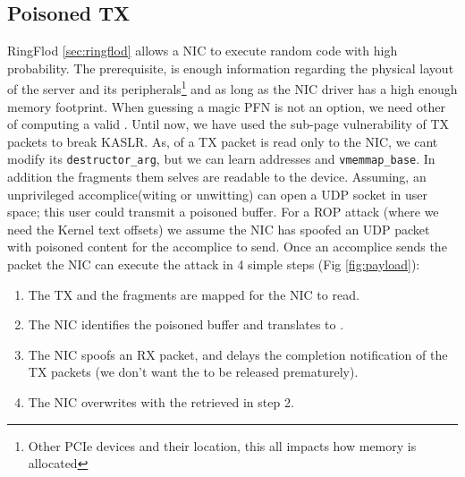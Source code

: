 \subsection{Poisoned TX}\label{sec:posion}
RingFlod \ref{sec:ringflod} allows a NIC to execute random code with high probability. The prerequisite, is enough information regarding the physical layout of the server and its peripherals\footnote{Other PCIe devices and their location, this all impacts how memory is allocated} and as long as the NIC driver has a high enough memory footprint. When guessing a magic PFN is not an option, we need other \means of computing a valid \kva.\newline
Until now, we have used the sub-page vulnerability of TX packets to break KASLR. As, \shinfo of a TX packet is read only to the NIC, we cant modify its \texttt{destructor\_arg}, but we can learn \page addresses and \texttt{vmemmap\_base}. In addition the fragments them selves are readable to the device. Assuming, an unprivileged accomplice(witing or unwitting) can open a UDP socket in user space; this user could transmit a poisoned buffer. For a ROP attack (where we need the Kernel text offsets) we assume the NIC has spoofed an UDP packet with poisoned content for the accomplice to send. Once an accomplice sends the packet the NIC can execute the attack in 4 simple steps (Fig \ref{fig:payload}):
\begin{enumerate}
    \item The TX \data and the fragments are mapped for the NIC to read.
    \item The NIC identifies the poisoned buffer and translates \page to \kva.
    \item The NIC spoofs an RX packet, and delays the completion notification of the TX packets (we don't want the \mabaf to be released prematurely).
    \item The NIC overwrites \shinfo with the \kva retrieved in step 2. 
\end{enumerate}
